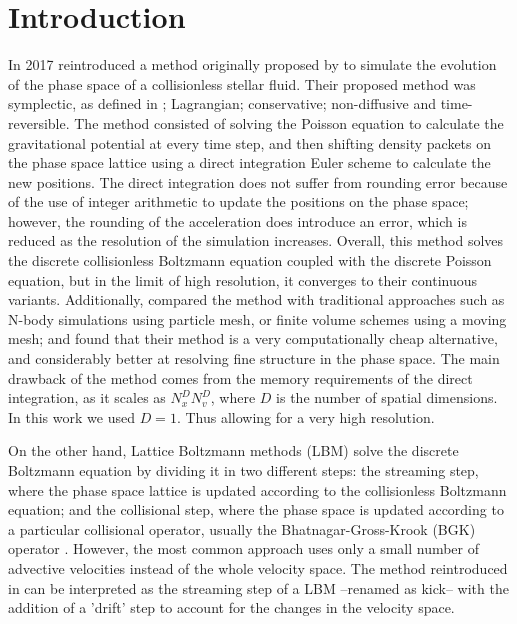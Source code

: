 \documentclass[fleqn,usenatbib]{mnras}
\begin{document}
\section{Introduction}
\label{sec: intro}
In 2017 \citet{integerLatticeDynamics} reintroduced a method originally proposed by \citet{latticeStellarDynamics} to simulate the evolution of the phase space of a collisionless stellar fluid. Their proposed method was symplectic, as defined in \citet{1992PhyD...56....1E}; Lagrangian; conservative; non-diffusive and time-reversible.
The method consisted of solving the Poisson equation to calculate the gravitational potential at every time step, and then shifting density packets on the phase space lattice using a direct integration Euler scheme to calculate the new positions. 
The direct integration does not suffer from rounding error because of the use of integer arithmetic to update the positions on the phase space; however, the rounding of the acceleration does introduce an error, which is reduced as the resolution of the simulation increases. 
Overall, this method solves the discrete collisionless Boltzmann equation coupled with the discrete Poisson equation, but in the limit of high resolution, it converges to their continuous variants. 
Additionally, \citeauthor{integerLatticeDynamics} compared the method with traditional approaches such as N-body simulations using particle mesh, or finite volume schemes using a moving mesh; and found that their method is a very computationally cheap alternative, and considerably better at resolving fine structure in the phase space.
The main drawback of the method comes from the memory requirements of the direct integration, as it scales as $N_x^D N_v^D$, where $D$ is the number of spatial dimensions. In this work we used $D = 1$. Thus allowing for a very high resolution.

On the other hand, Lattice Boltzmann methods (LBM) solve the discrete Boltzmann equation by dividing it in two different steps: the streaming step, where the phase space lattice is updated according to the collisionless Boltzmann equation; and the collisional step, where the phase space is updated according to a particular collisional operator, usually the Bhatnagar-Gross-Krook (BGK) operator \citep{1954PhRv...94..511B}. However, the most common approach uses only a small number of advective velocities instead of the whole velocity space. 
The method reintroduced in \citet{integerLatticeDynamics} can be interpreted as the streaming step of a LBM --renamed as kick-- with the addition of a 'drift' step to account for the changes in the velocity space.
\end{document}
